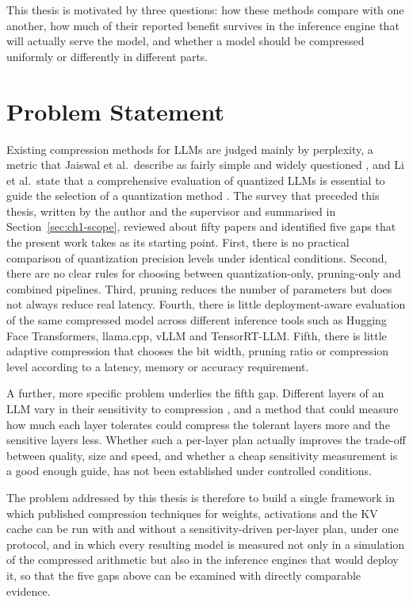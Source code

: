 This thesis is motivated by three questions: how these methods compare with one another, how much of their reported benefit survives in the inference engine that will actually serve the model, and whether a model should be compressed uniformly or differently in different parts.

\section{Problem Statement}
\label{sec:ch1-problem}

Existing compression methods for LLMs are judged mainly by perplexity, a metric that Jaiswal et al.\ describe as fairly simple and widely questioned \cite{jaiswal2024compressing}, and Li et al.\ state that a comprehensive evaluation of quantized LLMs is essential to guide the selection of a quantization method \cite{li2024evaluating}. The survey that preceded this thesis, written by the author and the supervisor and summarised in Section~\ref{sec:ch1-scope}, reviewed about fifty papers and identified five gaps that the present work takes as its starting point. First, there is no practical comparison of quantization precision levels under identical conditions. Second, there are no clear rules for choosing between quantization-only, pruning-only and combined pipelines. Third, pruning reduces the number of parameters but does not always reduce real latency. Fourth, there is little deployment-aware evaluation of the same compressed model across different inference tools such as Hugging Face Transformers, llama.cpp, vLLM and TensorRT-LLM. Fifth, there is little adaptive compression that chooses the bit width, pruning ratio or compression level according to a latency, memory or accuracy requirement.

A further, more specific problem underlies the fifth gap. Different layers of an LLM vary in their sensitivity to compression \cite{yuan2025asvd}, and a method that could measure how much each layer tolerates could compress the tolerant layers more and the sensitive layers less. Whether such a per-layer plan actually improves the trade-off between quality, size and speed, and whether a cheap sensitivity measurement is a good enough guide, has not been established under controlled conditions.

The problem addressed by this thesis is therefore to build a single framework in which published compression techniques for weights, activations and the KV cache can be run with and without a sensitivity-driven per-layer plan, under one protocol, and in which every resulting model is measured not only in a simulation of the compressed arithmetic but also in the inference engines that would deploy it, so that the five gaps above can be examined with directly comparable evidence.

